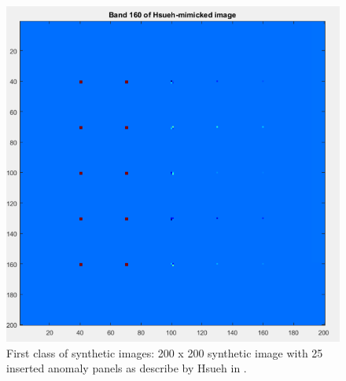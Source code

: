 


\begin{figure}[H]
\centering
   \includegraphics[scale=0.7]{images/AD_testing/synthetic_images/band_160_hsueh_picture_without_gaussian_noise.PNG}
  \caption{First class of synthetic images: 200 x 200 synthetic image with 25 inserted anomaly panels as describe by Hsueh in \cite{hsueh_master_thesis}. } 
  \label{fig:hsueh_image}
\end{figure}

